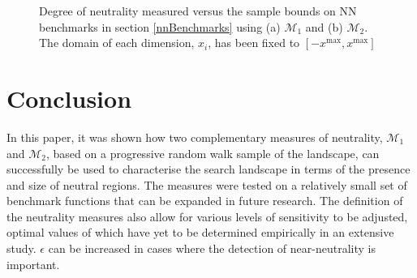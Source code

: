 \documentclass[conference]{IEEEtran}
\begin{document}
\begin{figure}[!t]
	\centering
	\label{figNNM1}	
	
	\label{figNNM2}	
	\caption{Degree of neutrality measured versus the sample bounds on NN benchmarks in section \ref{nnBenchmarks} using (a) ${\mathcal{M}_1}$ and (b) ${\mathcal{M}_2}$. The domain of each dimension, $x_i$, has been fixed to $[-x^{\text{max}}, x^{\text{max}}]$}
	\label{figNNNeutralityVsDomain}
\end{figure}

\section{Conclusion}
In this paper, it was shown how two complementary measures of neutrality, ${\mathcal{M}_1}$ and ${\mathcal{M}_2}$, based on a progressive random walk sample of the landscape, can successfully be used to characterise the search landscape in terms of the presence and size of neutral regions. The measures were tested on a relatively small set of benchmark functions that can be expanded in future research. The definition of the neutrality measures also allow for various levels of sensitivity to be adjusted, optimal values of which have yet to be determined empirically in an extensive study. $\epsilon$ can be increased in cases where the detection of near-neutrality is important. 
\end{document}

